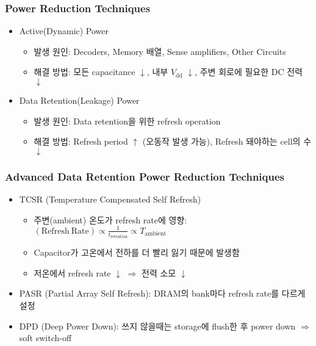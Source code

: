\subsubsection*{Power Reduction Techniques}
\begin{itemize}
    \item Active(Dynamic) Power
    \begin{itemize}
        \item 발생 원인: Decoders, Memory 배열, Sense amplifiers, Other Circuits
        \item 해결 방법: 모든 capacitance $\downarrow$, 내부 $V_{\mathrm{dd}}$ $\downarrow$, 주변 회로에 필요한 DC 전력 $\downarrow$
    \end{itemize}
    \item Data Retention(Leakage) Power
    \begin{itemize}
        \item 발생 원인: Data retention을 위한 refresh operation
        \item 해결 방법: Refresh period $\uparrow$ (오동작 발생 가능), Refresh 돼야하는 cell의 수 $\downarrow$
    \end{itemize}
\end{itemize}

\subsubsection*{Advanced Data Retention Power Reduction Techniques}
\begin{itemize}
    \item TCSR (Temperature Compensated Self Refresh)
    \begin{itemize}
        \item 주변(ambient) 온도가 refresh rate에 영향: $(\mathrm{Refresh~Rate}) \varpropto \frac 1 {t_{\mathrm{retention}}} \varpropto T_{\mathrm{ambient}}$
        \item Capacitor가 고온에서 전하를 더 빨리 잃기 때문에 발생함
        \item 저온에서 refresh rate $\downarrow$ $\Rightarrow$ 전력 소모 $\downarrow$
    \end{itemize}
    \item PASR (Partial Array Self Refresh): DRAM의 bank마다 refresh rate를 다르게 설정
    \item DPD (Deep Power Down): 쓰지 않을때는 storage에 flush한 후 power down $\Rightarrow$ soft switch-off
\end{itemize}
